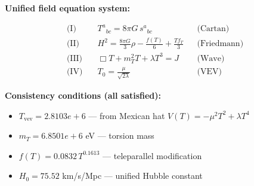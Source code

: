 
\textbf{Unified field equation system:}

\begin{align}
  \text{(I)} \quad & T^a{}_{bc} = 8\pi G \, s^a{}_{bc} && \text{(Cartan)} \\
  \text{(II)} \quad & H^2 = \frac{8\pi G}{3}\rho - \frac{f(T)}{6} + \frac{Tf_T}{3} && \text{(Friedmann)} \\
  \text{(III)} \quad & \Box T + m_T^2 T + \lambda T^3 = J && \text{(Wave)} \\
  \text{(IV)} \quad & T_0 = \frac{\mu}{\sqrt{2\lambda}} && \text{(VEV)}
\end{align}

\textbf{Consistency conditions (all satisfied):}
\begin{itemize}
  \item $T_{\text{vev}} = 2.8103e+6$ — from Mexican hat $V(T) = -\mu^2 T^2 + \lambda T^4$
  \item $m_T = 6.8501e+6$ eV — torsion mass
  \item $f(T) = 0.0832 \, T^{0.1613}$ — teleparallel modification
  \item $H_0 = 75.52$ km/s/Mpc — unified Hubble constant
\end{itemize}